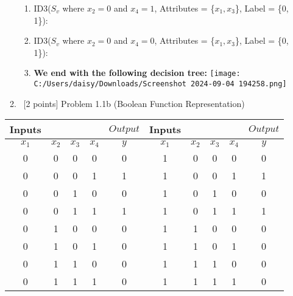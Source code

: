 \documentclass[8pt, fullpage,letterpaper]{article}
\begin{document}
\begin{enumerate}
\begin{enumerate}
\begin{enumerate}
	 	\item ID3($S_v$ where $x_2 = 0$ and $x_4 = 1$, Attributes = \{$x_1, x_3$\}, Label = \{0, 1\}): \\
				\centerline{}	

	 	\item ID3($S_v$ where $x_2 = 0$ and $x_4 = 0$, Attributes = \{$x_1, x_3$\}, Label = \{0, 1\}): \\
				\centerline{}	

	 	\item {\bf We end with the following decision tree:} 
			\center\texttt{[image: C:/Users/daisy/Downloads/Screenshot 2024-09-04 194258.png]}\\

	\end{enumerate}



\color{black}
\item~[2 points] Problem 1.1b (Boolean Function Representation)
\end{enumerate}

	\color{violet}

	\begin{table}[h]
		\centering
		\begin{tabular}{cccc|c||cccc|c}
			Inputs & &  & & $Output$ & Inputs & &  & & $Output$\\ 
			\hline
			$x_1$ & $x_2$ & $x_3$ & $x_4$ & $y$ & $x_1$ & $x_2$ & $x_3$ & $x_4$ & $y$\\ 
			\hline\hline
			0 & 0 & 0 & 0 & 0 & 1 & 0 & 0 & 0 & 0 \\ \hline
			0 & 0 & 0 & 1 & 1 & 1 & 0 & 0 & 1 & 1 \\ \hline
			0 & 0 & 1 & 0 & 0 & 1 & 0 & 1 & 0 & 0 \\ \hline
			0 & 0 & 1 & 1 & 1 & 1 & 0 & 1 & 1 & 1 \\ \hline
			0 & 1 & 0 & 0 & 0 & 1 & 1 & 0 & 0 & 0\\ \hline
			0 & 1 & 0 & 1 & 0 & 1 & 1 & 0 & 1 & 0\\ \hline
			0 & 1 & 1 & 0 & 0 & 1 & 1 & 1 & 0 & 0\\ \hline
			0 & 1 & 1 & 1 & 0 & 1 & 1 & 1 & 1 & 0\\ \hline


\end{tabular}
\end{table}
\end{enumerate}
\end{document}
